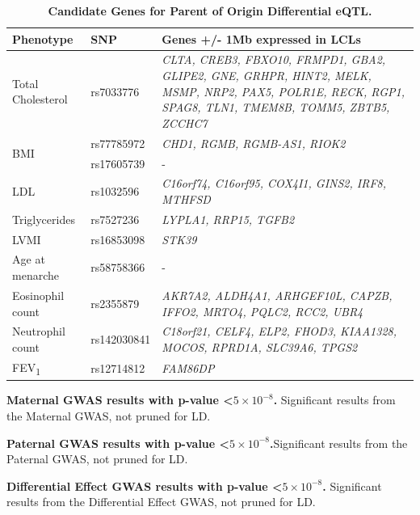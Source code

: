 \begin{table}
\centering
\begin{adjustbox}{width={\textwidth}}
\begin{tabular}{@{}p{5cm}|p{5cm}|p{10cm}@{}}
\toprule Phenotype & SNP & Genes +/- 1Mb expressed in LCLs \\ \midrule
Total Cholesterol & rs7033776 & \emph{CLTA, CREB3, FBXO10, FRMPD1, GBA2, GLIPE2, GNE, GRHPR, HINT2, MELK, MSMP, NRP2, PAX5, POLR1E, RECK, RGP1, SPAG8, TLN1, TMEM8B, TOMM5, ZBTB5, ZCCHC7} \\ \hline
\multirow{2}{5cm}{BMI} & rs77785972 & \emph{CHD1, RGMB, RGMB-AS1, RIOK2} \\ \cline{2-3}
 &  rs17605739	 & - \\ \hline
LDL & rs1032596 & \emph{C16orf74, C16orf95, COX4I1, GINS2, IRF8, MTHFSD}\\ \hline
Triglycerides & rs7527236 & \emph{LYPLA1, RRP15, TGFB2}\\ \hline
LVMI	 & rs16853098 & \emph{STK39} \\ \hline
Age at menarche & rs58758366 & -\\ \hline
Eosinophil count & rs2355879 & \emph{AKR7A2, ALDH4A1, ARHGEF10L, CAPZB, IFFO2, MRTO4, PQLC2, RCC2, UBR4}\\ \hline
Neutrophil count & rs142030841 & \emph{C18orf21, CELF4, ELP2, FHOD3, KIAA1328, MOCOS, RPRD1A, SLC39A6, TPGS2} \\ \hline
FEV\textsubscript{1} & rs12714812 & \emph{FAM86DP} \\ \bottomrule
\end{tabular}
\end{adjustbox}
\caption[Candidate Genes for Parent of Origin Differential eQTL. ]{\textbf{Candidate Genes for Parent of Origin Differential eQTL.}}
\label{tab:tab-s4}
\end{table}



\begin{table}
\caption[Maternal GWAS results with p-value \textless 5x10-08. ]{\textbf{Maternal GWAS results with p-value \textless $5 \times 10^{-8}$.} Significant results from the Maternal GWAS, not pruned for LD. }
\label{tab:tab-s5}
\end{table}


\begin{table}
\caption[Paternal GWAS results with p-value \textless 5x10-08. ]{\textbf{Paternal GWAS results with p-value \textless $5 \times 10^{-8}$.}Significant results from the Paternal GWAS, not pruned for LD.}
\label{tab:tab-s6}
\end{table}


\begin{table}
\caption[Differential Effect GWAS results with p-value \textless 5x10-08. ]{\textbf{Differential Effect  GWAS results with p-value \textless $5 \times 10^{-8}$.} Significant results from the Differential Effect GWAS, not pruned for LD.}
\end{table}


